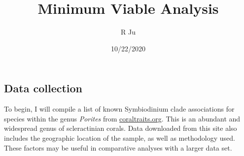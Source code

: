 \documentclass[]{article}
\title{Minimum Viable Analysis}
\author{R Ju}
\date{10/22/2020}
\begin{document}
\maketitle

\subsection{Data collection}\label{data-collection}

To begin, I will compile a list of known Symbiodinium clade associations
for species within the genus \emph{Porites} from \url{coraltraits.org}.
This is an abundant and widespread genus of scleractinian corals. Data
downloaded from this site also includes the geographic location of the
sample, as well as methodology used. These factors may be useful in
comparative analyses with a larger data set.
\end{document}
